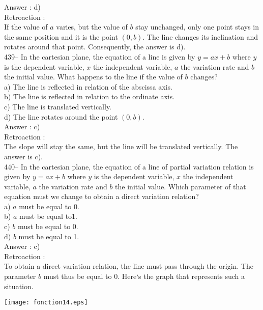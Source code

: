 ﻿\documentclass[letterpaper, 12pt]{article}
\begin{document}
Answer : d)\\

Retroaction : \\
If the value of $a$ varies, but the value of $b$ stay unchanged, only one point stays in the same position and it is the point $(0,b)$.  The line changes its inclination and rotates around that point.  Consequently,
the answer is d).\\

439-- In the cartesian plane, the equation of a line is given by 
$y=ax+b$ where $y$ is the dependent variable, $x$ the independent variable, $a$ the variation rate and $b$ the initial value.
What happens to the line if the value of $b$ changes?\\
a) The line is reflected in relation of the abscissa axis.\\
b) The line is reflected in relation to the ordinate axis.\\
c) The line is translated vertically.\\
d) The line rotates around the point $(0,b)$.\\

Answer : c)\\

Retroaction : \\
The slope will stay the same, but the line will be translated vertically.  The answer is c).\\

440-- In the cartesian plane, the equation of a line of partial variation relation is given by 
$y=ax+b$ where $y$ is the dependent variable, $x$ the independent variable, $a$ the variation rate and $b$ the initial value. Which parameter of that equation must we change to obtain a direct variation relation?\\
a) $a$ must be equal to 0.\\
b) $a$ must be equal to1.\\
c) $b$ must be equal to 0.\\
d) $b$ must be equal to 1.\\

Answer : c)\\

Retroaction : \\
To obtain a direct variation relation, the line must pass through the origin. The parameter $b$ must thus be equal to 0.
Here`s the graph that represents such a situation.  \\
    \begin{center}
    \texttt{[image: fonction14.eps]}
    \end{center}
\end{document}
